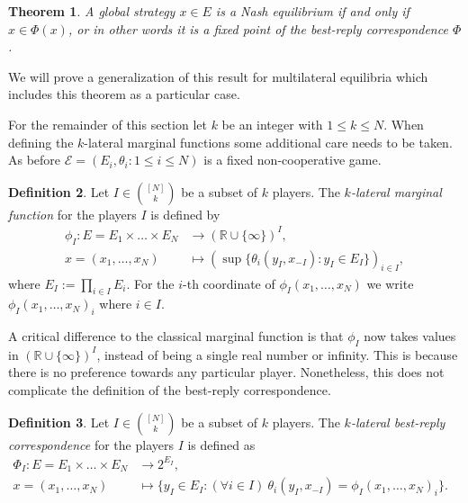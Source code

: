 \documentclass[a4paper,11pt,reqno,english]{amsart}
\theoremstyle{plain}
\newtheorem{theorem}{Theorem}[section]
\theoremstyle{definition}
\newtheorem{definition}[theorem]{Definition}
\newcommand{\Ecal}{\mathcal{E}}
\begin{document}
\begin{theorem}\label{thm:NashBestReplyCondition}
	A global strategy $x\in E$ is a Nash equilibrium if and only if $x\in\Phi(x)$, or in other words it is a fixed point of the best-reply correspondence $\Phi$.
\end{theorem}

\medskip
We will prove a generalization of this result for multilateral equilibria which includes this theorem as a particular case.


\medskip
For the remainder of this section let $k$ be an integer with $1\leq k\leq N$.
When defining the $k$-lateral marginal functions  some additional care needs to be taken.
As before $\Ecal=(E_i, \theta_i : 1\leq i\leq N)$ is a fixed non-cooperative game.

\begin{definition}\label{def:MultilateralMarginal}
	Let $I\in\binom{[N]}{k}$ be a subset of $k$ players. The {\em $k$-lateral marginal function} for the players $I$ is defined by
	\begin{align*}
		\phi_I\colon E = E_1\times\dots\times E_N & \longrightarrow (\mathbb{R}\cup\{\infty\})^{I}  ,                 \\
		x = (x_1,\dots,x_N)                       & \longmapsto (\sup\{\theta_i(y_I,x_{-I}) : y_I\in E_I\})_{i\in I},
	\end{align*}
	where $E_I:=\prod_{i\in I}E_i$.
	For the $i$-th coordinate of $\phi_I(x_1,\dots,x_N)$ we write $\phi_I(x_1,\dots,x_N)_i$ where $i\in I$.
\end{definition}

\medskip
A critical difference to the classical marginal function is that $\phi_I$ now takes values in $(\mathbb{R}\cup\{\infty\})^{I}$, instead of being a single real number or infinity.
This is because there is no preference towards any particular player.
Nonetheless, this does not complicate the definition of the best-reply correspondence.

\begin{definition}\label{def:MultilateralBestReplyCorrespondence}
	Let $I\in\binom{[N]}{k}$ be a subset of $k$ players.
	The {\em $k$-lateral best-reply correspondence} for the players $I$ is defined as
	\begin{align*}
		\Phi_I\colon E =  E_1\times\dots\times E_N & \longrightarrow 2^{E_I}  ,                                                                               & \\
		x = (x_1,\dots,x_N)                        & \longmapsto \big\{y_I\in E_I : (\forall i\in I) \ \theta_i(y_I, x_{-I}) = \phi_I(x_1,\dots,x_N)_i\big\}. &
	\end{align*}
\end{definition}
\end{document}
